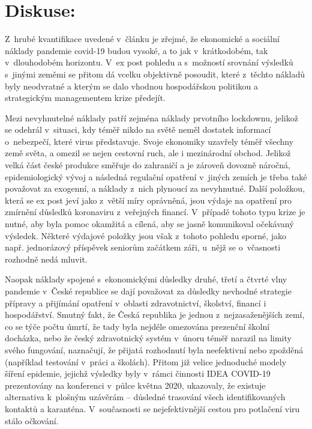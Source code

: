 \section*{Diskuse:} 
Z~hrubé kvantifikace uvedené v~článku je zřejmé, že ekonomické a sociální náklady pandemie covid-19 budou vysoké, a to jak v~krátkodobém, tak v~dlouhodobém horizontu. V~ex post pohledu a s~možností srovnání výsledků s~jinými zeměmi se přitom dá vcelku objektivně posoudit, které z~těchto nákladů byly neodvratné a kterým se dalo vhodnou hospodářskou politikou a strategickým managementem krize předejít.

Mezi nevyhnutelné náklady patří zejména náklady prvotního lockdownu, jelikož se odehrál v~situaci, kdy téměř nikdo na světě neměl dostatek informací o~nebezpečí, které virus představuje. Svoje ekonomiky uzavřely téměř všechny země světa, a omezil se nejen cestovní ruch, ale i mezinárodní obchod. Jelikož velká část české produkce směřuje do zahraničí a je zároveň dovozně náročná, epidemiologický vývoj a následná regulační opatření v~jiných zemích je třeba také považovat za exogenní, a náklady z~nich plynoucí za nevyhnutné. Další položkou, která se ex post jeví jako z~větší míry oprávněná, jsou výdaje na opatření pro zmírnění důsledků koronaviru z~veřejných financí. V~případě tohoto typu krize je nutné, aby byla pomoc okamžitá a cílená, aby se jasně komunikoval očekávaný výsledek. Některé výdajové položky jsou však z~tohoto pohledu sporné, jako např. jednorázový příspěvek seniorům začátkem záři, u~nějž se o~včasnosti rozhodně nedá mluvit.

Naopak náklady spojené s~ekonomickými důsledky druhé, třetí a čtvrté vlny pandemie v~České republice se dají považovat za důsledky nevhodné strategie přípravy a přijímání opatření v~oblasti zdravotnictví, školství, financí i hospodářství. Smutný fakt, že Česká republika je jednou z~nejzasaženějších zemí, co se týče počtu úmrtí, že tady byla nejdéle omezována prezenční školní docházka, nebo že český zdravotnický systém v~únoru téměř narazil na limity svého fungování, naznačují, že přijatá rozhodnutí byla neefektivní nebo zpožděná (například testování v~práci a školách). Přitom již velice jednoduché modely šíření epidemie, jejichž výsledky byly v~rámci činnosti IDEA COVID-19 prezentovány na konferenci v~půlce května 2020, ukazovaly, že existuje alternativa k~plošným uzávěrám – důsledné trasování všech identifikovaných kontaktů a karanténa. V~současnosti se nejefektivnější cestou pro potlačení viru stálo očkování. 
